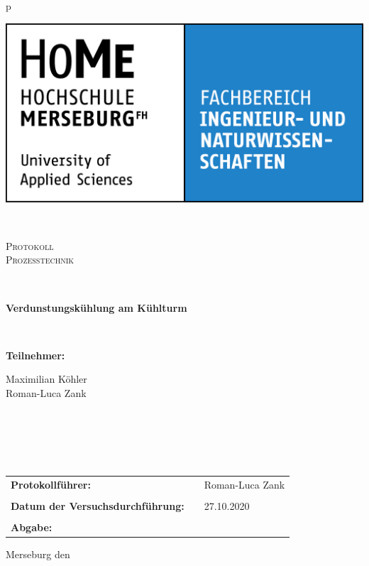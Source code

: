 \begin{center}
\begin{tabular}{p{\textwidth}}


\begin{center}
\includegraphics[scale=0.75]{logos.jpg}\\
\end{center}


\\

\begin{center}
\LARGE{\textsc{
Protokoll \\
Prozesstechnik\\
}}
\end{center}

\\

\begin{center}
\textbf{\Large{Verdunstungskühlung  am Kühlturm}}
\end{center}


\\


\begin{center}
\Large{\textbf{Teilnehmer:}} \\ 
\end{center}
\begin{center}
\large{Maximilian Köhler}\\
\large{Roman-Luca Zank} \\
\end{center}


\\ \\ \\ \\

\begin{center}
\begin{tabular}{lll}
\large{\textbf{Protokollführer:}} & & \large{Roman-Luca Zank}\\
&&\\
\large{\textbf{Datum der Versuchsdurchführung:}}&& \large{27.10.2020}\\
&&\\
\large{\textbf{Abgabe:}}&& \large{\todayDE}
\end{tabular}
\end{center}

\end{tabular}
\end{center}
\vfill
\large{Merseburg den \todayDE}
